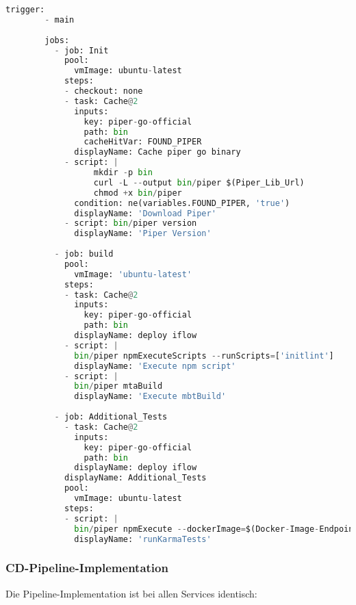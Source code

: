 \begin{lstlisting}[language=Python, breaklines=true, basicstyle=\small\ttfamily, frame=single]
        trigger:
        - main
        
        jobs:
          - job: Init
            pool:
              vmImage: ubuntu-latest
            steps:
            - checkout: none
            - task: Cache@2
              inputs:
                key: piper-go-official
                path: bin
                cacheHitVar: FOUND_PIPER
              displayName: Cache piper go binary
            - script: |
                  mkdir -p bin
                  curl -L --output bin/piper $(Piper_Lib_Url)
                  chmod +x bin/piper
              condition: ne(variables.FOUND_PIPER, 'true')
              displayName: 'Download Piper'
            - script: bin/piper version
              displayName: 'Piper Version'
        
          - job: build
            pool:
              vmImage: 'ubuntu-latest'
            steps:
            - task: Cache@2
              inputs:
                key: piper-go-official
                path: bin 
              displayName: deploy iflow
            - script: |
              bin/piper npmExecuteScripts --runScripts=['initlint']
              displayName: 'Execute npm script'
            - script: |
              bin/piper mtaBuild 
              displayName: 'Execute mbtBuild'
        
          - job: Additional_Tests
            - task: Cache@2
              inputs:
                key: piper-go-official
                path: bin 
              displayName: deploy iflow
            displayName: Additional_Tests
            pool:
              vmImage: ubuntu-latest
            steps: 
            - script: |
              bin/piper npmExecute --dockerImage=$(Docker-Image-Endpoint) --npmRunCommand='run mykarma:ci'
              displayName: 'runKarmaTests'
        \end{lstlisting}
 
        \subsubsection{CD-Pipeline-Implementation}
        Die Pipeline-Implementation ist bei allen Services identisch:\\
        
